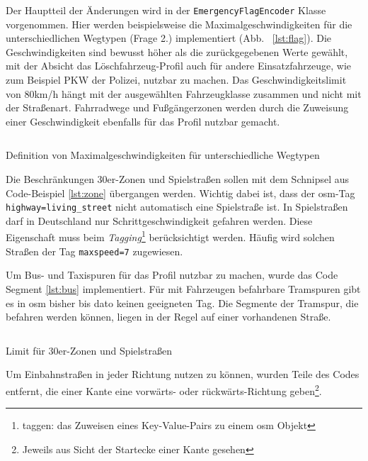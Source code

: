 Der Hauptteil der Änderungen wird in der \texttt{EmergencyFlagEncoder} Klasse vorgenommen.
Hier werden beispielsweise die Maximalgeschwindigkeiten für die unterschiedlichen Wegtypen (Frage 2.) implementiert (Abb. ~\ref{lst:flag}).
Die Geschwindigkeiten sind bewusst höher als die zurückgegebenen Werte gewählt, mit der Absicht das Löschfahrzeug-Profil auch für andere Einsatzfahrzeuge, wie zum Beispiel PKW der Polizei, nutzbar zu machen.
Das Geschwindigkeitslimit von 80km/h hängt mit der ausgewählten Fahrzeugklasse zusammen und nicht mit der Straßenart.
Fahrradwege und Fußgängerzonen werden durch die Zuweisung einer Geschwindigkeit ebenfalls für das Profil nutzbar gemacht.

\begin{listing}[htb]
\centering
{}
\inputminted[gobble=2, fontsize=\footnotesize, breaklines, breakbytoken=|, firstline=169, lastline=199]{java}{../data/JavaFiles/EmergencyFlagEncoder.java}
\caption{Definition von Maximalgeschwindigkeiten für unterschiedliche Wegtypen}
\label{lst:flag}
\end{listing}

Die Beschränkungen 30er-Zonen und Spielstraßen sollen mit dem Schnipsel aus Code-Beispiel \ref{lst:zone} übergangen werden.
Wichtig dabei ist, dass der \gls{osm}-Tag \texttt{highway=living\_street} nicht automatisch eine Spielstraße ist.
In Spielstraßen darf in Deutschland nur Schrittgeschwindigkeit gefahren werden.
Diese Eigenschaft muss beim \textit{Tagging}\footnote{taggen: das Zuweisen eines Key-Value-Pairs zu einem \gls{osm} Objekt} berücksichtigt werden.
Häufig wird solchen Straßen der Tag \texttt{maxspeed=7} zugewiesen.


Um Bus- und Taxispuren für das Profil nutzbar zu machen, wurde das Code Segment \ref{lst:bus} implementiert.
Für mit Fahrzeugen befahrbare Tramspuren gibt es in \gls{osm} bisher bis dato keinen geeigneten Tag.
Die Segmente der Tramspur, die befahren werden können, liegen in der Regel auf einer vorhandenen Straße.
\begin{listing}[htb]
\centering
{}
\inputminted[gobble=2, fontsize=\footnotesize, breaklines=true, breakbytoken=|, firstline=299, lastline=303]{java}{../data/JavaFiles/EmergencyFlagEncoder.java}
\caption{Limit für 30er-Zonen und Spielstraßen}
\label{lst:zone}
\end{listing}

Um Einbahnstraßen in jeder Richtung nutzen zu können, wurden Teile des Codes entfernt, die einer Kante eine vorwärts- oder rückwärts-Richtung geben\footnote{Jeweils aus Sicht der Startecke einer Kante gesehen}.

